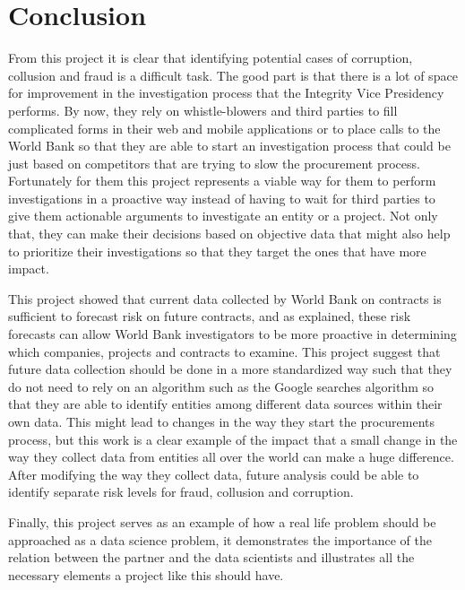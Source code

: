 \chapter{Conclusion}\label{chap_conclusion}

From this project it is clear that identifying potential cases of corruption, collusion  and fraud is a difficult task. The good part is that there is a lot of space for improvement in the investigation process that the Integrity Vice Presidency performs. By now, they rely on whistle-blowers and third parties to fill complicated forms in their web  and mobile applications or to place calls to the World Bank so that they are able to start an investigation process that could be just based on competitors that are trying to slow the procurement process. Fortunately for them this project represents a viable way for them to perform investigations in a proactive way instead of having to wait for third parties to give them actionable arguments to investigate an entity or a project. Not only that, they can make their decisions based on objective data that might also help to prioritize their investigations so that they target the ones that have more impact.

This project showed that current data collected by World Bank on contracts is sufficient to forecast risk on future contracts, and as explained, these risk forecasts can allow World Bank investigators to be more proactive in determining which companies, projects and contracts to examine. This project suggest that future data collection should be done in a more standardized way such that they do not need to rely on an algorithm such as the Google searches algorithm  so that they are able to identify entities among different data sources within their own data. This might lead to changes in the way they start the procurements process, but this work is a clear example of the impact that a small change in the way they collect data from entities all over the world can make a huge difference. After modifying the way they collect data, future analysis could be able to identify separate risk levels for fraud, collusion and corruption.

Finally, this project serves as an example of how a real life problem should be approached as a data science problem, it demonstrates the importance of the relation between the partner and the data scientists and illustrates all the necessary elements a project like this should have.